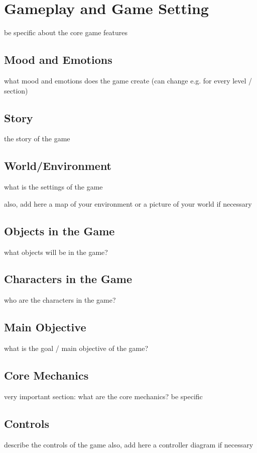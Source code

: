 \documentclass[a4paper]{scrreprt}
\begin{document}


\chapter{Gameplay and Game Setting}
be specific about the core game features 

\section{Mood and Emotions}
what mood and emotions does the game create (can change e.g. for every level / section) 

\section{Story}
the story of the game

\section{World/Environment}
what is the settings of the game 

also, add here a map of your environment or a picture of your world if necessary

\section{Objects in the Game}
what objects will be in the game?

\section{Characters in the Game}
who are the characters in the game?

\section{Main Objective}
what is the goal / main objective of the game?

\section{Core Mechanics}
very important section: what are the core mechanics? be specific

\section{Controls}
describe the controls of the game 
also, add here a controller diagram if necessary 
\end{document}
